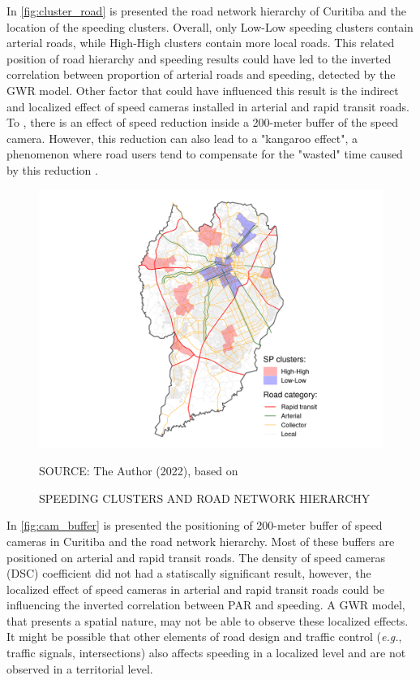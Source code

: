 In \autoref{fig:cluster_road} is presented the road network hierarchy of Curitiba and the location of the speeding clusters. Overall, only Low-Low speeding clusters contain arterial roads, while High-High clusters contain more local roads. This related position of road hierarchy and speeding results could have led to the inverted correlation between proportion of arterial roads and speeding, detected by the GWR model. Other factor that could have influenced this result is the indirect and localized effect of speed cameras installed in arterial and rapid transit roads. To \textcite{Li2013a, Oliveira2015}, there is an effect of speed reduction inside a 200-meter buffer of the speed camera. However, this reduction can also lead to a "kangaroo effect", a phenomenon where road users tend to compensate for the "wasted" time caused by this reduction \cite{Amancio2021,Li2020}. 

\begin{figure}[!htbp]
    \footnotesize
    \captionsetup{font=footnotesize}
    \caption{SPEEDING CLUSTERS AND ROAD NETWORK HIERARCHY}
    \centering
    \includegraphics{fig/lisa_sp_roadctb.png}
    \label{fig:cluster_road}
    \par SOURCE: The Author (2022), based on \textcite{IPPUC2021}
\end{figure}

In \autoref{fig:cam_buffer} is presented the positioning of 200-meter buffer of speed cameras in Curitiba and the road network hierarchy. Most of these buffers are positioned on arterial and rapid transit roads. The density of speed cameras (DSC) coefficient did not had a statiscally significant result, however, the localized effect of speed cameras in arterial and rapid transit roads could be influencing the inverted correlation between PAR and speeding. A GWR model, that presents a spatial nature, may not be able to observe these localized effects. It might be possible that other elements of road design and traffic control (\textit{e.g.}, traffic signals, intersections) also affects speeding in a localized level and are not observed in a territorial level.  

